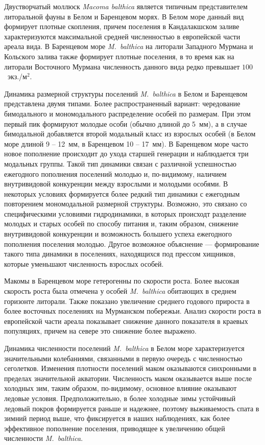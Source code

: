 Двустворчатый моллюск \textit{Macoma balthica} является типичным представителем литоральной фауны в Белом и Баренцевом морях. 
В Белом море данный вид формирует плотные скопления, причем поселения в Кандалакшском заливе характеризуются максимальной средней численностью в европейской части ареала вида.
В Баренцевом море \textit{M.~balthica} на литорали Западного Мурмана и Кольского залива также формирует плотные поселения, в то время как на литорали Восточного Мурмана численность данного вида редко превышает $100$~экз./м$^2$.

Динамика размерной структуры поселений {\it M.~balthica} в Белом и Баренцевом представлена двумя типами.
Более распространенный вариант: чередование бимодального и мономодального распределение особей по размерам. 
При этом первый пик формируют молодые особи (обычно длиной до 5~мм), а в случае бимодальной добавляется второй модальный класс из взрослых особей (в Белом море длиной 9 -- 12~мм, в Баренцевом 10 -- 17~мм). 
В Баренцевом море часто новое пополнение происходит до ухода старшей генерации и наблюдается три модальных группы. 
Такой тип динамики связан с различной успешностью ежегодного пополнения поселений молодью и, по-видимому, наличием внутривидовой конкуренции между взрослыми и молодыми особями.
В некоторых условиях формируется более редкий тип динамики с ежегодным повторением мономодальной размерной структуры. 
Возможно, это связано со специфическими условиями гидродинамики, в которых происходт разделение молодых и старых особей по способу питания и, таким образом, снижение внутривидовой конкуренции и возможность большего успеха ежегодного пополнения поселения молодью. 
Другое возможное объяснение --- формирование такого типа динамики в поселениях, находящихся под прессом хищников, которые уменьшают численность взрослых особей.

Макомы в Баренцевом море гетерогенны по скорости роста. 
Более высокая скорость роста была отмечена у особей {\it M.~balthica} обитающих в среднем горизонте литорали.
Также показано увеличение среднего годового прироста в более восточных поселениях на Мурманском побережьи.
Анализ скорости роста в европейской части ареала показывает снижение данного показателя в краевых популяциях, причем на севере это снижение более выражено.

Динамика численности поселений {\it M.~balthica} в Белом море характеризуется значительными колебаниями, связанными в первую очередь с численностью сеголетков. Изменения плотности поселений маком оказываются синхронными в пределах значительной акватории.
Численность маком оказывается выше после холодных зим, таким образом, по-видимому, основное влияние оказывают ледовые условия.
Предположительно, в более холодные зимы устойчивый ледовый покров формируется раньше и надежнее, поэтому выживаемость спата в зимний период выше, что фиксируется в наших наблюдениях, как более эффективное пополнение поселения, приводящее к увеличению общей численности {\it M.~balthica}.

